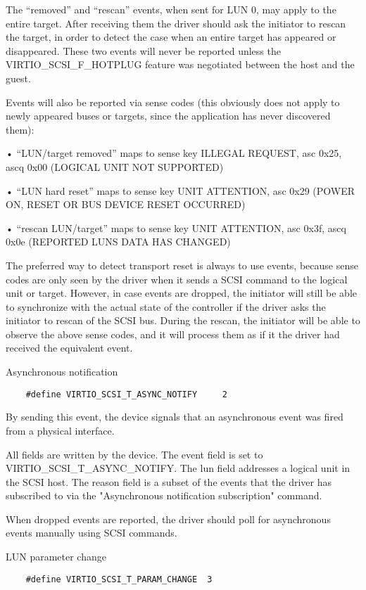   The “removed” and “rescan” events, when sent for LUN 0, may
  apply to the entire target. After receiving them the driver
  should ask the initiator to rescan the target, in order to
  detect the case when an entire target has appeared or
  disappeared. These two events will never be reported unless the
  VIRTIO_SCSI_F_HOTPLUG feature was negotiated between the host
  and the guest.

  Events will also be reported via sense codes (this obviously
  does not apply to newly appeared buses or targets, since the
  application has never discovered them):

  • “LUN/target removed” maps to sense key ILLEGAL REQUEST, asc
    0x25, ascq 0x00 (LOGICAL UNIT NOT SUPPORTED)

  • “LUN hard reset” maps to sense key UNIT ATTENTION, asc 0x29
    (POWER ON, RESET OR BUS DEVICE RESET OCCURRED)

  • “rescan LUN/target” maps to sense key UNIT ATTENTION, asc
    0x3f, ascq 0x0e (REPORTED LUNS DATA HAS CHANGED)

  The preferred way to detect transport reset is always to use
  events, because sense codes are only seen by the driver when it
  sends a SCSI command to the logical unit or target. However, in
  case events are dropped, the initiator will still be able to
  synchronize with the actual state of the controller if the
  driver asks the initiator to rescan of the SCSI bus. During the
  rescan, the initiator will be able to observe the above sense
  codes, and it will process them as if it the driver had
  received the equivalent event.

  Asynchronous notification
\begin{lstlisting}
	#define VIRTIO_SCSI_T_ASYNC_NOTIFY     2
\end{lstlisting}

  By sending this event, the device signals that an asynchronous
  event was fired from a physical interface.

  All fields are written by the device. The event field is set to
  VIRTIO_SCSI_T_ASYNC_NOTIFY. The lun field addresses a logical
  unit in the SCSI host. The reason field is a subset of the
  events that the driver has subscribed to via the "Asynchronous
  notification subscription" command.

  When dropped events are reported, the driver should poll for
  asynchronous events manually using SCSI commands.

  LUN parameter change
\begin{lstlisting}
	#define VIRTIO_SCSI_T_PARAM_CHANGE  3
\end{lstlisting}

